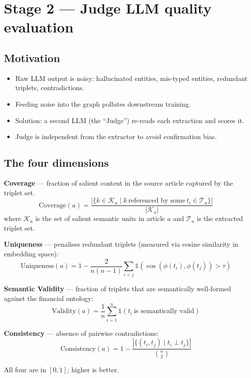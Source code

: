 \documentclass[11pt]{article}
\begin{document}
\section{Stage 2 --- Judge LLM quality evaluation}
\label{sec:judge}

\subsection{Motivation}
\begin{itemize}
  \item Raw LLM output is noisy: hallucinated entities, mis-typed entities, redundant triplets, contradictions.
  \item Feeding noise into the graph pollutes downstream training.
  \item Solution: a second LLM (the ``Judge'') re-reads each extraction and scores it.
  \item Judge is independent from the extractor to avoid confirmation bias.
\end{itemize}

\subsection{The four dimensions}

\textbf{Coverage} --- fraction of salient content in the source article captured by the triplet set.
\[
  \text{Coverage}(a) = \frac{|\{k \in \mathcal{K}_a \mid k\ \text{referenced by some}\ t_i \in \mathcal{T}_a\}|}{|\mathcal{K}_a|}
\]
where \(\mathcal{K}_a\) is the set of salient semantic units in article \(a\) and \(\mathcal{T}_a\) is the extracted triplet set.

\textbf{Uniqueness} --- penalises redundant triplets (measured via cosine similarity in embedding space):
\[
  \text{Uniqueness}(a) = 1 - \frac{2}{n(n-1)} \sum_{i<j} \mathbb{1}(\cos(\phi(t_i), \phi(t_j)) > \tau)
\]

\textbf{Semantic Validity} --- fraction of triplets that are semantically well-formed against the financial ontology:
\[
  \text{Validity}(a) = \frac{1}{n} \sum_{i=1}^n \mathbb{1}(t_i\ \text{is semantically valid})
\]

\textbf{Consistency} --- absence of pairwise contradictions:
\[
  \text{Consistency}(a) = 1 - \frac{|\{(t_i, t_j) \mid t_i \perp t_j\}|}{\binom{n}{2}}
\]

All four are in \([0, 1]\); higher is better.
\end{document}
